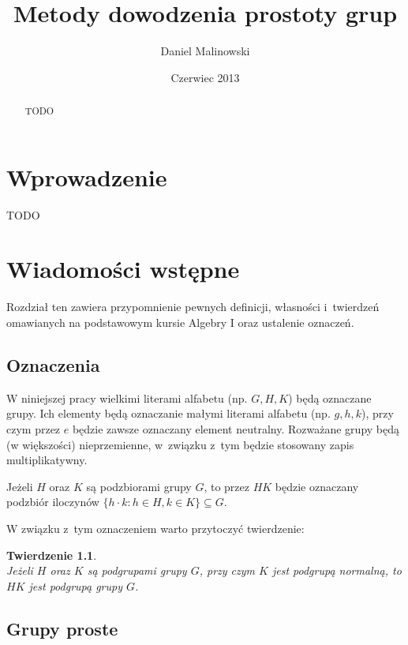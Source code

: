 \documentclass[licencjacka]{pracamgr}
\author{Daniel Malinowski}
\title{Metody dowodzenia prostoty grup}
\date{Czerwiec 2013}
\newtheorem{thh}{Twierdzenie}[section]
\begin{document}
\maketitle

\begin{abstract}
    TODO
\end{abstract}

\tableofcontents


\chapter*{Wprowadzenie}

TODO

\chapter{Wiadomości wstępne}

Rozdział ten zawiera przypomnienie pewnych definicji, własności
i~twierdzeń omawianych na podstawowym kursie
Algebry I oraz ustalenie oznaczeń.

\section{Oznaczenia}

W niniejszej pracy wielkimi literami alfabetu (np.
$G, H, K$) będą oznaczane grupy. Ich elementy będą oznaczanie małymi
literami alfabetu (np. $g, h, k$), przy czym przez $e$ będzie zawsze
oznaczany element neutralny. Rozważane grupy będą (w większości)
nieprzemienne, w~związku z~tym będzie stosowany zapis
multiplikatywny.

Jeżeli $H$ oraz $K$ są podzbiorami grupy $G$, to przez $HK$
będzie oznaczany podzbiór iloczynów $\{ h\cdot k \colon h \in H, k \in K\}\subseteq G$.

W związku z~tym oznaczeniem warto przytoczyć twierdzenie:

\begin{thh} \label{mult_groups} $ $ \\
    Jeżeli $H$ oraz $K$ są podgrupami grupy $G$, przy czym $K$ jest podgrupą normalną,
    to $HK$ jest podgrupą grupy $G$.
\end{thh}


\section{Grupy proste}
\end{document}
